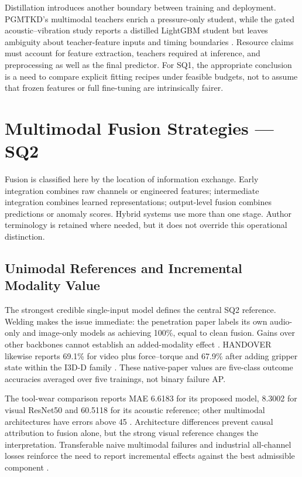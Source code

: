 Distillation introduces another boundary between training and deployment. PGMTKD's multimodal teachers enrich a pressure-only student, while the gated acoustic--vibration study reports a distilled LightGBM student but leaves ambiguity about teacher-feature inputs and timing boundaries \citep{Li2025PGMTKD,Huang2026Rolling}. Resource claims must account for feature extraction, teachers required at inference, and preprocessing as well as the final predictor. For SQ1, the appropriate conclusion is a need to compare explicit fitting recipes under feasible budgets, not to assume that frozen features or full fine-tuning are intrinsically fairer.

\section{Multimodal Fusion Strategies --- SQ2}

Fusion is classified here by the location of information exchange. Early integration combines raw channels or engineered features; intermediate integration combines learned representations; output-level fusion combines predictions or anomaly scores. Hybrid systems use more than one stage. Author terminology is retained where needed, but it does not override this operational distinction.

\subsection{Unimodal References and Incremental Modality Value}
The strongest credible single-input model defines the central SQ2 reference. Welding makes the issue immediate: the penetration paper labels its own audio-only and image-only models as achieving 100\%, equal to clean fusion. Gains over other backbones cannot establish an added-modality effect \citep[PDF pp.~18, 22]{Hua2026Weld}. HANDOVER likewise reports 69.1\% for video plus force--torque and 67.9\% after adding gripper state within the I3D-D family \citep[PDF p.~7, Table~III]{Thoduka2024Handover}. These native-paper values are five-class outcome accuracies averaged over five trainings, not binary failure AP.

The tool-wear comparison reports MAE 6.6183 for its proposed model, 8.3002 for visual ResNet50 and 60.5118 for its acoustic reference; other multimodal architectures have errors above 45 \citep[PDF p.~24, Table~1]{P045}. Architecture differences prevent causal attribution to fusion alone, but the strong visual reference changes the interpretation. Transferable naive multimodal failures and industrial all-channel losses reinforce the need to report incremental effects against the best admissible component \citep{Wang2020What,Goodarzi2023Deep}.


